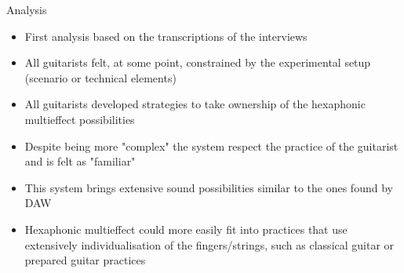 \documentclass[final]{beamer}
\newlength{\onecolwid}
\begin{document}
\begin{frame}[t]
\begin{columns}[t]
\begin{column}{\onecolwid}
\begin{block}{Analysis}
\begin{itemize}
    \item First analysis based on the transcriptions of the interviews
    \item All guitarists felt, at some point, constrained by the experimental setup (scenario or technical elements) 
    \item All guitarists developed strategies to take ownership of the hexaphonic multieffect possibilities
    \item Despite being more "complex" the system respect the practice of the guitarist and is felt as "familiar" 
    \item This system brings extensive sound possibilities similar to the ones found by DAW
    \item Hexaphonic multieffect could more easily fit into practices that use extensively individualisation of the fingers/strings, such as classical guitar or prepared guitar practices
\end{itemize}


    

    



\end{block}
\end{column}
\end{columns}
\end{frame}
\end{document}
